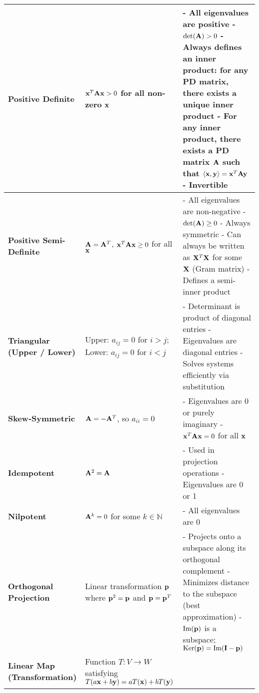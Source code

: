 \documentclass[12pt]{article}
\begin{document}
\begin{longtable}{|>{\bfseries}m{3.5cm}|m{5cm}|m{10.5cm}|}
		\hline
		Positive Definite & $\mathbf{x}^T \mathbf{A} \mathbf{x} > 0$ for all non-zero $\mathbf{x}$ &
		- All eigenvalues are positive \newline
		- $\det(\mathbf{A}) > 0$ \newline
		- Always defines an inner product: for any PD matrix, there exists a unique inner product \newline
		- For any inner product, there exists a PD matrix $\mathbf{A}$ such that $\langle \mathbf{x}, \mathbf{y}
		\rangle = \mathbf{x}^T \mathbf{A} \mathbf{y}$ \newline
		- Invertible \\
		\hline
		Positive Semi-Definite & $\mathbf{A} = \mathbf{A}^T$, $\mathbf{x}^T \mathbf{A} \mathbf{x} \ge 0$ for all $\mathbf{x}$ &
		- All eigenvalues are non-negative \newline
		- $\det(\mathbf{A}) \ge 0$ \newline
		- Always symmetric \newline
		- Can always be written as $\mathbf{X}^T \mathbf{X}$ for some $\mathbf{X}$ (Gram matrix) \newline
		- Defines a semi-inner product \\
		\hline
		Triangular (Upper / Lower) &
		Upper: $a_{ij} = 0$ for $i > j$; Lower: $a_{ij} = 0$ for $i < j$ &
		- Determinant is product of diagonal entries \newline
		- Eigenvalues are diagonal entries \newline
		- Solves systems efficiently via substitution \\
		\hline
		Skew-Symmetric & $\mathbf{A} = -\mathbf{A}^T$, so $a_{ii} = 0$ &
		- Eigenvalues are 0 or purely imaginary \newline
		- $\mathbf{x}^T \mathbf{A} \mathbf{x} = 0$ for all $\mathbf{x}$ \\
		\hline
		Idempotent & $\mathbf{A}^2 = \mathbf{A}$ &
		- Used in projection operations \newline
		- Eigenvalues are 0 or 1 \\
		\hline
		Nilpotent & $\mathbf{A}^k = 0$ for some $k \in \mathbb{N}$ &
		- All eigenvalues are 0 \\
		\hline
		Orthogonal Projection & Linear transformation $\mathbf{p}$ where $\mathbf{p}^2 = \mathbf{p}$
		and $\mathbf{p} = \mathbf{p}^T$ &
		- Projects onto a subspace along its orthogonal complement \newline
		- Minimizes distance to the subspace (best approximation) \newline
		- $\text{Im}(\mathbf{p})$ is a subspace; $\text{Ker}(\mathbf{p}) = \text{Im}(\mathbf{I} - \mathbf{p})$ \\
		\hline
		Linear Map (Transformation) & Function $T: V \rightarrow W$
		satisfying $T(a\mathbf{x} + b\mathbf{y}) = aT(\mathbf{x}) + bT(\mathbf{y})$ &

\end{longtable}
\end{document}
